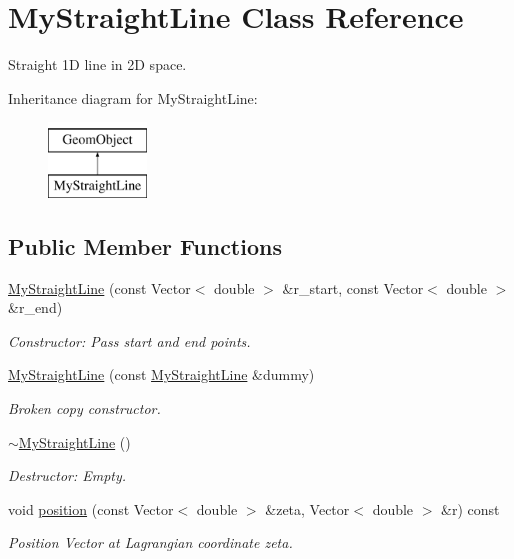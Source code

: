 \hypertarget{classMyStraightLine}{}\section{My\+Straight\+Line Class Reference}
\label{classMyStraightLine}


Straight 1D line in 2D space.  


Inheritance diagram for My\+Straight\+Line\+:\begin{figure}[H]
\begin{center}
\leavevmode
\includegraphics[height=2.000000cm]{classMyStraightLine}
\end{center}
\end{figure}
\subsection*{Public Member Functions}
\begin{DoxyCompactItemize}
\item 
\hyperlink{classMyStraightLine_a2c63e574f21703250a31fc446ab8045d}{My\+Straight\+Line} (const Vector$<$ double $>$ \&r\+\_\+start, const Vector$<$ double $>$ \&r\+\_\+end)
\begin{DoxyCompactList}\small\item\em Constructor\+: Pass start and end points. \end{DoxyCompactList}\item 
\hyperlink{classMyStraightLine_a4c42312f35a3cf72f2f39e88ad28202f}{My\+Straight\+Line} (const \hyperlink{classMyStraightLine}{My\+Straight\+Line} \&dummy)
\begin{DoxyCompactList}\small\item\em Broken copy constructor. \end{DoxyCompactList}\item 
\hyperlink{classMyStraightLine_ae2f9a5860652a726b2f4dc94d1332ef1}{$\sim$\+My\+Straight\+Line} ()
\begin{DoxyCompactList}\small\item\em Destructor\+: Empty. \end{DoxyCompactList}\item 
void \hyperlink{classMyStraightLine_ae3ee51a7b81acc2ef652bec4ee955d2f}{position} (const Vector$<$ double $>$ \&zeta, Vector$<$ double $>$ \&r) const
\begin{DoxyCompactList}\small\item\em Position Vector at Lagrangian coordinate zeta. \end{DoxyCompactList}\end{DoxyCompactItemize}

